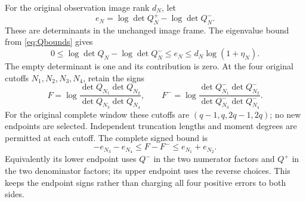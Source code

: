 \documentclass[11pt]{article}
\begin{document}
For the original observation image rank $d_N$, let
\begin{equation}\label{eq:deterror}
 e_N=\log\det Q_N^+-\log\det Q_N^-.
\end{equation}
These are determinants in the unchanged image frame.  The eigenvalue
bound from \eqref{eq:Qbounds} gives
\begin{equation}\label{eq:detcap}
 0\le\log\det Q_N-\log\det Q_N^-
 \le e_N\le d_N\log(1+\eta_N).
\end{equation}
The empty determinant is one and its contribution is zero.
At the four original cutoffs $N_1,N_2,N_3,N_4$, retain the signs
\[
 F=\log\frac{\det Q_{N_1}\det Q_{N_2}}
                    {\det Q_{N_3}\det Q_{N_4}},\qquad
 F^-=\log\frac{\det Q_{N_1}^-\det Q_{N_2}^-}
                     {\det Q_{N_3}^-\det Q_{N_4}^-}.
\]
For the original complete window these cutoffs are
$(q-1,q,2q-1,2q)$; no new endpoints are selected.  Independent
truncation lengths and moment degrees are permitted at each cutoff.
The complete signed bound is
\begin{equation}\label{eq:four}
 \boxed{-e_{N_3}-e_{N_4}\le F-F^-
                       \le e_{N_1}+e_{N_2}.}
\end{equation}
Equivalently its lower endpoint uses $Q^-$ in the two numerator
factors and $Q^+$ in the two denominator factors; its upper endpoint
uses the reverse choices.  This keeps the endpoint signs rather than
charging all four positive errors to both sides.
\end{document}
